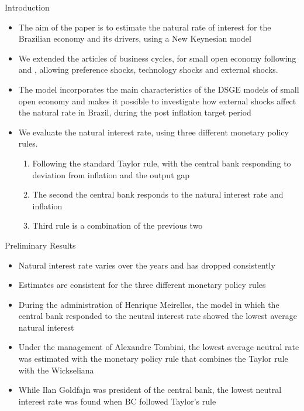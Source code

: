 \documentclass[9pt]{beamer}
\let\olditem\item
\renewcommand{\item}{%
\olditem\vspace{\fill}}
\begin{document}
\begin{frame}{Introduction}
\begin{itemize}
\item The aim of the paper is to estimate the natural rate of interest for the Brazilian economy and its drivers, using a New Keynesian model

\item We extended the articles of business cycles, for small open economy following \textcolor{red}{\citet{Gali:2005}} and \textcolor{red}{\citet{Lubik:2007}}, allowing preference shocks, technology shocks and external shocks.

\item The model incorporates the main characteristics of the DSGE models of small open economy and makes it possible to investigate how external shocks affect the natural rate in Brazil, during the post inflation target period

\item We evaluate the natural interest rate, using three different monetary policy rules. 
\begin{enumerate}
    \item Following the standard Taylor rule, with the central bank responding to deviation from inflation and the output gap
    
    \item The second the central bank responds to the natural interest rate and inflation
    
    \item Third rule is a combination of the previous two
\end{enumerate} 


\end{itemize}
\end{frame}
\begin{frame}{Preliminary Results}
\begin{itemize}
    \item Natural interest rate varies over the years and has dropped consistently
    
    \item Estimates are consistent for the three different monetary policy rules
    
    \item During the administration of Henrique Meirelles, the model in which the central bank responded to the neutral interest rate showed the lowest average natural interest
    
    \item Under the management of Alexandre Tombini, the lowest average neutral rate was estimated with the monetary policy rule that combines the Taylor rule with the Wickseliana
    
    \item While Ilan Goldfajn was president of the central bank, the lowest neutral interest rate was found when BC followed Taylor's rule
    
\end{itemize}


\end{frame}
\end{document}
